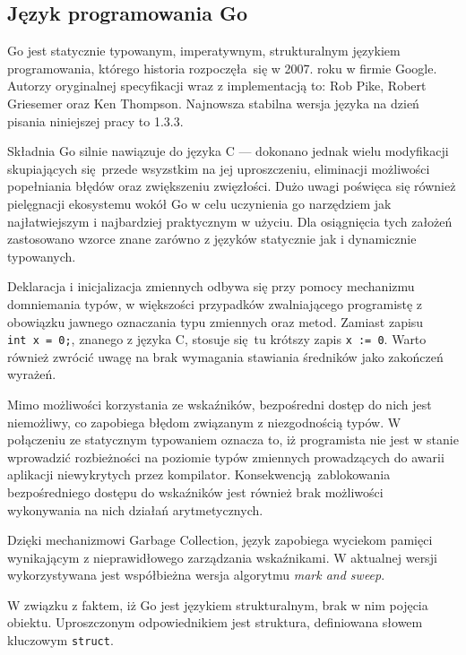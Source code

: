 \subsection{Język programowania Go} %
\label{ss_internals_go}
\par{
Go jest statycznie typowanym, imperatywnym, strukturalnym językiem programowania, którego historia rozpoczęła się w 2007. roku w firmie Google. Autorzy oryginalnej specyfikacji wraz z implementacją to: Rob Pike, Robert Griesemer oraz Ken Thompson.
Najnowsza stabilna wersja języka na dzień pisania niniejszej pracy to 1.3.3.
}
\par{
Składnia Go silnie nawiązuje do języka C --- dokonano jednak wielu modyfikacji skupiających się przede wsyzstkim na jej uproszczeniu, eliminacji możliwości popełniania błędów oraz zwiększeniu zwięzłości.
Dużo uwagi poświęca się również pielęgnacji ekosystemu wokół Go w celu uczynienia go narzędziem jak najłatwiejszym i najbardziej praktycznym w użyciu.
Dla osiągnięcia tych założeń zastosowano wzorce znane zarówno z języków statycznie jak i dynamicznie typowanych.
}
\par{Deklaracja i inicjalizacja zmiennych odbywa się przy pomocy mechanizmu domniemania typów, w większości przypadków zwalniającego programistę z obowiązku jawnego oznaczania typu zmiennych oraz metod. Zamiast zapisu \texttt{int~x~=~0;}, znanego z języka C, stosuje się tu krótszy zapis \texttt{x~:=~0}. Warto również zwrócić uwagę na brak wymagania stawiania średników jako zakończeń wyrażeń.
}
 \par{Mimo możliwości korzystania ze wskaźników, bezpośredni dostęp do nich jest niemożliwy, co zapobiega błędom związanym z niezgodnością typów. W połączeniu ze statycznym typowaniem oznacza to, iż programista nie jest w stanie wprowadzić rozbieżności na poziomie typów zmiennych prowadzących do awarii aplikacji niewykrytych przez kompilator. Konsekwencją zablokowania bezpośredniego dostępu do wskaźników jest również brak możliwości wykonywania na nich działań arytmetycznych.
 }
 \par{
Dzięki mechanizmowi Garbage Collection, język zapobiega wyciekom pamięci wynikającym z nieprawidłowego zarządzania wskaźnikami. W aktualnej wersji wykorzystywana jest współbieżna wersja algorytmu \textit{mark and sweep}.
}
\par{
 W związku z faktem, iż Go jest językiem strukturalnym, brak w nim pojęcia obiektu. Uproszczonym odpowiednikiem jest struktura, definiowana słowem kluczowym \texttt{struct}.
}

